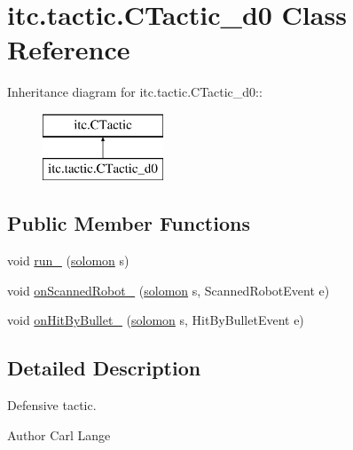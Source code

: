 \hypertarget{classitc_1_1tactic_1_1_c_tactic__d0}{
\section{itc.tactic.CTactic\_\-d0 Class Reference}
\label{classitc_1_1tactic_1_1_c_tactic__d0}
}
Inheritance diagram for itc.tactic.CTactic\_\-d0::\begin{figure}[H]
\begin{center}
\leavevmode
\includegraphics[height=2cm]{classitc_1_1tactic_1_1_c_tactic__d0}
\end{center}
\end{figure}
\subsection*{Public Member Functions}
\begin{DoxyCompactItemize}
\item 
void \hyperlink{classitc_1_1tactic_1_1_c_tactic__d0_a1f8e1863b6d1848867239230dd77b8f8}{run\_\-} (\hyperlink{classitc_1_1solomon}{solomon} s)
\item 
void \hyperlink{classitc_1_1tactic_1_1_c_tactic__d0_a85a50bae05c5e1b1bf7bdc450325ae0e}{onScannedRobot\_\-} (\hyperlink{classitc_1_1solomon}{solomon} s, ScannedRobotEvent e)
\item 
void \hyperlink{classitc_1_1tactic_1_1_c_tactic__d0_a4af101273ae2df9ee3c58641e1b1e422}{onHitByBullet\_\-} (\hyperlink{classitc_1_1solomon}{solomon} s, HitByBulletEvent e)
\end{DoxyCompactItemize}


\subsection{Detailed Description}
Defensive tactic.

\begin{DoxyAuthor}{Author}
Carl Lange 
\end{DoxyAuthor}


